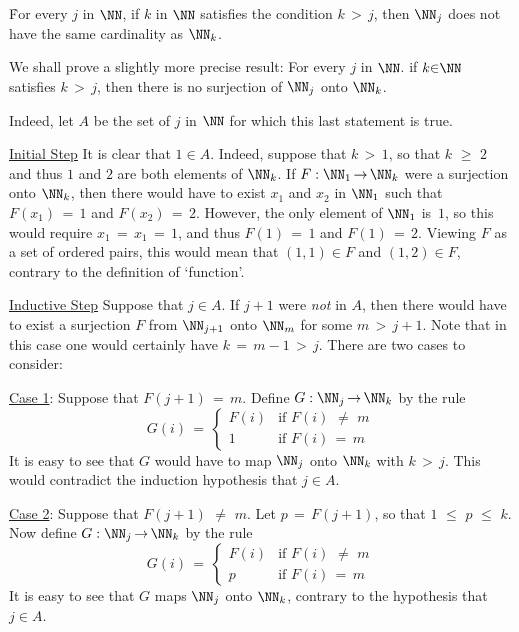 {\V

        \h For every $j$ in ${\NN}$, if $k$ in ${\NN}$ satisfies the condition $k\,>\,j$, then ${\NN}_{j}$ does not have the same cardinality as ${\NN}_{k}$.

\V

\noindent We shall prove a slightly more precise result: For every $j$ in ${\NN}$. if $k{\in}{\NN}$ satisfies $k\,>\,j$,
    then there is no surjection of ${\NN}_{j}$ onto ${\NN}_{k}$.

        Indeed, let $A$ be the set of $j$ in ${\NN}$ for which this last statement is true.


        \underline{Initial Step} It is clear that $1{\in}A$.
    Indeed, suppose that $k\,>\,1$, so that $k\,\,{\geq}\,\,2$ and thus $1$ and $2$ are both elements of ${\NN}_{k}$.
    If $F:{\NN}_{1} \,{\rightarrow}\, {\NN}_{k}$ were a surjection onto ${\NN}_{k}$,
    then there would have to exist $x_{1}$ and $x_{2}$ in ${\NN}_{1}$ such that $F(x_{1}) \,=\, 1$ and $F(x_{2}) \,=\, 2$.
    However, the only element of ${\NN}_{1}$ is~$1$, so this would require $x_{1} \,=\, x_{1} \,=\, 1$, and thus $F(1) \,=\, 1$ and $F(1) \,=\, 2$.
    Viewing $F$ as a set of ordered pairs, this would mean that $(1,1){\in}F$ and $(1,2){\in}F$, contrary to the definition of `function'.

        \underline{Inductive Step} Suppose that $j{\in}A$. If $j+1$ were {\em not} in $A$,
    then there would have to exist a surjection $F$ from ${\NN}_{j+1}$ onto ${\NN}_{m}$ for some $m\,>\,j+1$.
    Note that in this case one would certainly have $k \,=\, m-1\,>\,j$. There are two cases to consider:

        \h \underline{Case 1}: Suppose that $F(j+1) \,=\, m$.
    Define $G:{\NN}_{j} \,{\rightarrow}\, {\NN}_{k}$ by the rule
        \begin{displaymath}
        G(i) \,=\, \left\{
        \begin{array}{cl}
        F(i) & \mbox{if $F(i) \,\,{\neq}\,\, m$} \\
           1 & \mbox{if $F(i) \,=\, m$}
        \end{array}
        \right.
        \end{displaymath}
    It is easy to see that $G$ would have to map ${\NN}_{j}$ onto ${\NN}_{k}$ with $k\,>\,j$.
    This would contradict the induction hypothesis that $j{\in}A$.

        \h \underline{Case 2}: Suppose that $F(j+1) \,\,{\neq}\,\, m$. Let $p \,=\, F(j+1)$, so that $1\,\,{\leq}\,\,p\,\,{\leq}\,\,k$.
    Now define $G:{\NN}_{j} \,{\rightarrow}\, {\NN}_{k}$ by the rule
        \begin{displaymath}
        G(i) \,=\,
        \left\{
        \begin{array}{cl}
        F(i) & \mbox{if $F(i) \,\,{\neq}\,\, m$} \\
          p  & \mbox{if $F(i) \,=\, m$}
        \end{array}
        \right.
        \end{displaymath}
    It is easy to see that $G$ maps ${\NN}_{j}$ onto ${\NN}_{k}$, contrary to the hypothesis that $j{\in}A$.

}
